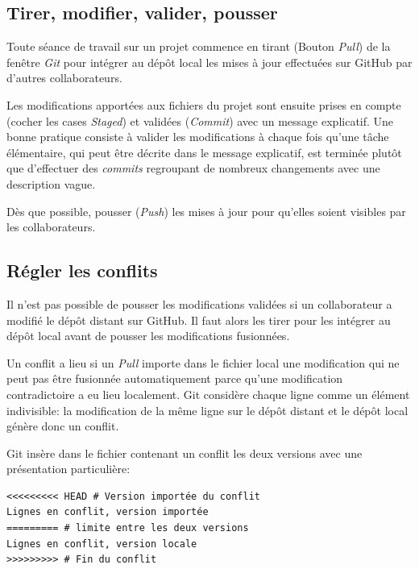 \documentclass[
  12pt,
  french,
  a4paper,
  extrafontsizes,onecolumn,openright
  ]{memoir}
\begin{document}
\hypertarget{tirer-modifier-valider-pousser}{%
\subsection{Tirer, modifier, valider, pousser}\label{tirer-modifier-valider-pousser}}

Toute séance de travail sur un projet commence en tirant (Bouton \emph{Pull}) de la fenêtre \emph{Git} pour intégrer au dépôt local les mises à jour effectuées sur GitHub par d'autres collaborateurs.

Les modifications apportées aux fichiers du projet sont ensuite prises en compte (cocher les cases \emph{Staged}) et validées (\emph{Commit}) avec un message explicatif.
Une bonne pratique consiste à valider les modifications à chaque fois qu'une tâche élémentaire, qui peut être décrite dans le message explicatif, est terminée plutôt que d'effectuer des \emph{commits} regroupant de nombreux changements avec une description vague.

Dès que possible, pousser (\emph{Push}) les mises à jour pour qu'elles soient visibles par les collaborateurs.

\hypertarget{ruxe9gler-les-conflits}{%
\subsection{Régler les conflits}\label{ruxe9gler-les-conflits}}

Il n'est pas possible de pousser les modifications validées si un collaborateur a modifié le dépôt distant sur GitHub.
Il faut alors les tirer pour les intégrer au dépôt local avant de pousser les modifications fusionnées.

Un conflit a lieu si un \emph{Pull} importe dans le fichier local une modification qui ne peut pas être fusionnée automatiquement parce qu'une modification contradictoire a eu lieu localement.
Git considère chaque ligne comme un élément indivisible: la modification de la même ligne sur le dépôt distant et le dépôt local génère donc un conflit.

Git insère dans le fichier contenant un conflit les deux versions avec une présentation particulière:

\begin{verbatim}
<<<<<<<<< HEAD # Version importée du conflit
Lignes en conflit, version importée
========= # limite entre les deux versions
Lignes en conflit, version locale
>>>>>>>>> # Fin du conflit
\end{verbatim}
\end{document}
